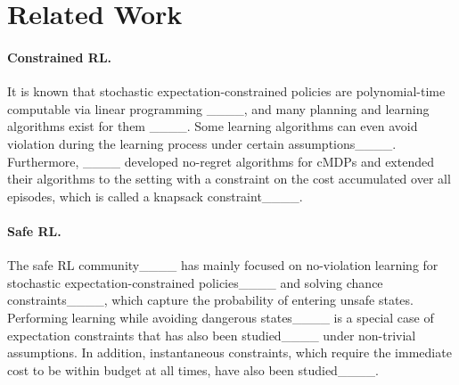 \section{Related Work}
\label{subsec: related-work}

\paragraph{Constrained RL.} It is known that stochastic expectation-constrained policies are polynomial-time computable via linear programming ____, and many planning and learning algorithms exist for them ____. Some learning algorithms can even avoid violation during the learning process under certain assumptions____. Furthermore, ____ developed no-regret algorithms for cMDPs and extended their algorithms to the setting with a constraint on the cost accumulated over all episodes, which is called a knapsack constraint____.


\paragraph{Safe RL.} The safe RL community____ has mainly focused on no-violation learning for stochastic expectation-constrained policies____ and solving chance constraints____, which capture the probability of entering unsafe states. Performing learning while avoiding dangerous states____ is a special case of expectation constraints that has also been studied____ under non-trivial assumptions. In addition, instantaneous constraints, which require the immediate cost to be within budget at all times, have also been studied____.